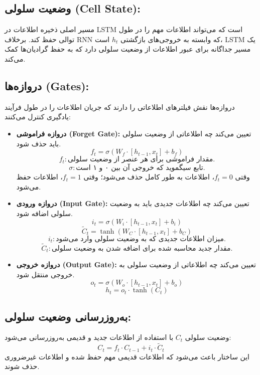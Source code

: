 \subsection{وضعیت سلولی (Cell State):}

مسیر اصلی ذخیره اطلاعات در LSTM است که می‌تواند اطلاعات مهم را در طول توالی حفظ کند. برخلاف RNN که وابسته به خروجی‌های بازگشتی \( h_t \) است، LSTM یک مسیر جداگانه برای عبور اطلاعات از وضعیت سلولی دارد که به حفظ گرادیان‌ها کمک می‌کند.

\subsection{دروازه‌ها (Gates):}
دروازه‌ها نقش فیلترهای اطلاعاتی را دارند که جریان اطلاعات را در طول فرآیند یادگیری کنترل می‌کنند:

\begin{itemize}
	\item \textbf{دروازه فراموشی (Forget Gate):} تعیین می‌کند چه اطلاعاتی از وضعیت سلولی باید حذف شود.
	\[
	f_t = \sigma \left( W_f \cdot \left[ h_{t-1}, x_t \right] + b_f \right)
	\]
	\[
	f_t: \text{مقدار فراموشی برای هر عنصر از وضعیت سلولی.}
	\]
	\[
	\sigma: \text{تابع سیگموید که خروجی آن بین ۰ و ۱ است.}
	\]
	وقتی \( f_t = 0 \)، اطلاعات به طور کامل حذف می‌شود؛ وقتی \( f_t = 1 \)، اطلاعات حفظ می‌شود.
	
	\item \textbf{دروازه ورودی (Input Gate):} تعیین می‌کند چه اطلاعات جدیدی باید به وضعیت سلولی اضافه شود.
	\[
	i_t = \sigma \left( W_i \cdot \left[ h_{t-1}, x_t \right] + b_i \right)
	\]
	\[
	\tilde{C}_t = \tanh \left( W_C \cdot \left[ h_{t-1}, x_t \right] + b_C \right)
	\]
	\[
	i_t: \text{میزان اطلاعات جدیدی که به وضعیت سلولی وارد می‌شود.}
	\]
	\[
	\tilde{C}_t: \text{مقدار جدید محاسبه شده برای اضافه شدن به وضعیت سلولی.}
	\]
	
	\item \textbf{دروازه خروجی (Output Gate):} تعیین می‌کند چه اطلاعاتی از وضعیت سلولی به خروجی منتقل شود.
	\[
	o_t = \sigma \left( W_o \cdot \left[ h_{t-1}, x_t \right] + b_o \right)
	\]
	\[
	h_t = o_t \cdot \tanh(C_t)
	\]
\end{itemize}

\subsection{به‌روزرسانی وضعیت سلولی:}

وضعیت سلولی \( C_t \) با استفاده از اطلاعات جدید و قدیمی به‌روزرسانی می‌شود:
\[
C_t = f_t \cdot C_{t-1} + i_t \cdot \tilde{C}_t
\]
این ساختار باعث می‌شود که اطلاعات قدیمی مهم حفظ شده و اطلاعات غیرضروری حذف شوند.

